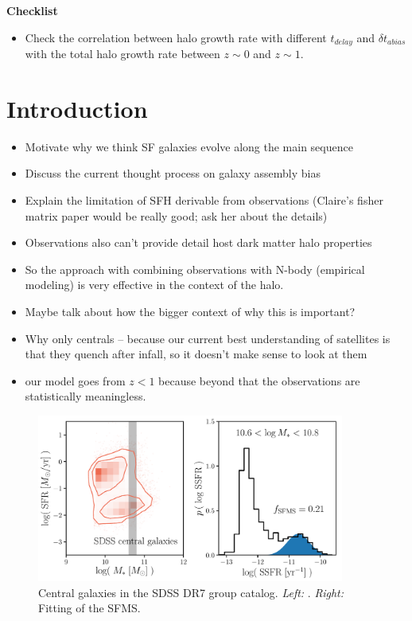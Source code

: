 \documentclass[12pt, letterpaper, preprint]{aastex}
\newcommand{\bitem}{\begin{itemize}}
\newcommand{\eitem}{\end{itemize}}
\begin{document}
{\bf Checklist} 
\bitem
\item Check the correlation between halo growth rate with different $t_{delay}$ and $\delta t_{abias}$ with the total halo growth rate between $z \sim 0$ and $z \sim 1$. 
\eitem 

\section{Introduction}
\bitem 
\item Motivate why we think SF galaxies evolve along the main sequence  
\item Discuss the current thought process on galaxy assembly bias 
\item Explain the limitation of SFH derivable from observations (Claire's fisher matrix paper would be really good; ask her about the details) 
\item Observations also can't provide detail host dark matter halo properties
\item So the approach with combining observations with N-body (empirical modeling) is very effective in the context of the halo.
\item Maybe talk about how the bigger context of why this is important?  
\item Why only centrals -- because our current best understanding of satellites is that they quench after infall, so it doesn't make sense to look at them
\item our model goes from $z < 1$ because beyond that the observations are statistically meaningless.  
\eitem 

\begin{figure}
\begin{center}
\includegraphics[width=0.9\textwidth]{figs/groupcat.pdf}
    \caption{Central galaxies in the SDSS DR7 group catalog. \emph{Left:} . 
    \emph{Right:}
    Fitting of the SFMS.}
\label{fig:groupcat}
\end{center}
\end{figure}
\end{document}

